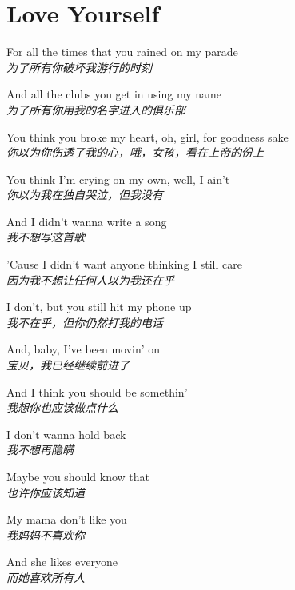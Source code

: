 \section{Love Yourself}

\thispagestyle{empty}


\begin{spacing}{1.5}
\begin{flushleft}
For all the times that you rained on my parade\\
\textit{为了所有你破坏我游行的时刻}\lyricspace

And all the clubs you get in using my name\\
\textit{为了所有你用我的名字进入的俱乐部}\lyricspace

You think you broke my heart, oh, girl, for goodness sake\\
\textit{你以为你伤透了我的心，哦，女孩，看在上帝的份上}\lyricspace

You think I'm crying on my own, well, I ain't\\
\textit{你以为我在独自哭泣，但我没有}\lyricspace

And I didn't wanna write a song\\
\textit{我不想写这首歌}\lyricspace

'Cause I didn't want anyone thinking I still care\\
\textit{因为我不想让任何人以为我还在乎}\lyricspace

I don't, but you still hit my phone up\\
\textit{我不在乎，但你仍然打我的电话}\lyricspace

And, baby, I've been movin' on\\
\textit{宝贝，我已经继续前进了}\lyricspace

And I think you should be somethin'\\
\textit{我想你也应该做点什么}\lyricspace

I don't wanna hold back\\
\textit{我不想再隐瞒}\lyricspace

Maybe you should know that\\
\textit{也许你应该知道}\lyricspace

My mama don't like you\\
\textit{我妈妈不喜欢你}\lyricspace

And she likes everyone\\
\textit{而她喜欢所有人}\lyricspace


\end{flushleft}
\end{spacing}
